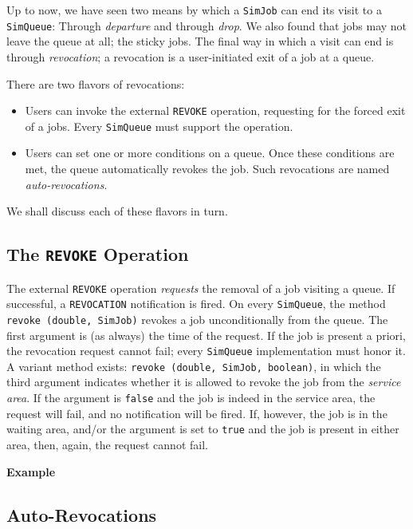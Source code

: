 \documentclass[12pt]{book}
\begin{document}
Up to now,
  we have seen two means by which a \lstinline|SimJob|
  can end its visit to a \lstinline|SimQueue|:
  Through {\em departure\/}
  and through {\em drop}.
We also found that jobs may not leave the queue at all;
  the sticky jobs.
The final way in which a visit can end is through {\em revocation};
  a revocation is a user-initiated exit of a job at a queue.

There are two flavors of revocations:
\begin{itemize}
\item
  Users can invoke the external \lstinline|REVOKE| operation,
    requesting for the forced exit of a jobs.
  Every \lstinline|SimQueue| must support the operation.
\item
  Users can set one or more conditions on a queue.
  Once these conditions are met, the queue automatically
    revokes the job.
  Such revocations are named {\em auto-revocations}.
\end{itemize}

We shall discuss each of these flavors in turn.

\subsection{The \lstinline|REVOKE| Operation}

The external \lstinline|REVOKE| operation
  {\em requests\/} the removal of a job visiting a queue.
If successful,
  a \lstinline|REVOCATION| notification is fired.
On every \lstinline|SimQueue|,
  the method \lstinline|revoke (double, SimJob)|
  revokes a job unconditionally from the queue.
The first argument is (as always)
  the time of the request.
If the job is present a priori,
  the revocation request cannot fail;
  every \lstinline|SimQueue| implementation
  must honor it.
A variant method exists: \lstinline|revoke (double, SimJob, boolean)|,
  in which the third argument indicates
  whether it is allowed to revoke the job
  from the {\em service area}.
If the argument is \lstinline|false| and the job is indeed
  in the service area,
  the request will fail,
  and no notification will be fired.
If, however, the job is in the waiting area,
  and/or the argument is set to \lstinline|true|
  and the job is present in either area,
  then, again, the request cannot fail.

{\bf Example}

\subsection{Auto-Revocations}
\end{document}

